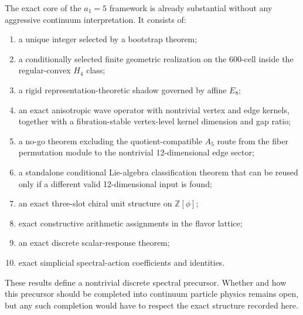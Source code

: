 \documentclass[12pt,a4paper]{article}
\theoremstyle{definition}
\begin{document}
The exact core of the $a_1=5$ framework is already substantial without any aggressive continuum interpretation.  It consists of:
\begin{enumerate}
\item a unique integer selected by a bootstrap theorem;
\item a conditionally selected finite geometric realization on the 600-cell inside the regular-convex $H_4$ class;
\item a rigid representation-theoretic shadow governed by affine $E_8$;
\item an exact anisotropic wave operator with nontrivial vertex and edge kernels, together with a fibration-stable vertex-level kernel dimension and gap ratio;
\item a no-go theorem excluding the quotient-compatible $A_5$ route from the fiber permutation module to the nontrivial 12-dimensional edge sector;
\item a standalone conditional Lie-algebra classification theorem that can be reused only if a different valid 12-dimensional input is found;
\item an exact three-slot chiral unit structure on $\mathbb{Z}[\phi]$;
\item exact constructive arithmetic assignments in the flavor lattice;
\item an exact discrete scalar-response theorem;
\item exact simplicial spectral-action coefficients and identities.
\end{enumerate}
These results define a nontrivial discrete spectral precursor.  Whether and how this precursor should be completed into continuum particle physics remains open, but any such completion would have to respect the exact structure recorded here.
\end{document}
